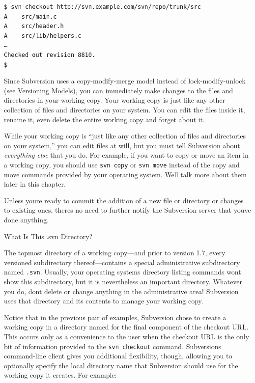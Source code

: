 \begin{verbatim}
$ svn checkout http://svn.example.com/svn/repo/trunk/src
A    src/main.c
A    src/header.h
A    src/lib/helpers.c
…
Checked out revision 8810.
$
\end{verbatim}

Since Subversion uses a copy-modify-merge model instead of
lock-modify-unlock (see \hyperref[svn.basic.vsn-models]{Versioning
Models}), you can immediately make changes to the files and directories
in your working copy. Your working copy is just like any other
collection of files and directories on your system. You can edit the
files inside it, rename it, even delete the entire working copy and
forget about it.

While your working copy is ``just like any other collection of files and
directories on your system,'' you can edit files at will, but you must
tell Subversion about \emph{everything else} that you do. For example,
if you want to copy or move an item in a working copy, you should use
\texttt{svn\ copy} or \texttt{svn\ move} instead of the copy and move
commands provided by your operating system. We\textquotesingle ll talk
more about them later in this chapter.

Unless you\textquotesingle re ready to commit the addition of a new file
or directory or changes to existing ones, there\textquotesingle s no
need to further notify the Subversion server that you\textquotesingle ve
done anything.

What Is This .svn Directory?

The topmost directory of a working copy---and prior to version 1.7,
every versioned subdirectory thereof---contains a special administrative
subdirectory named \texttt{.svn}. Usually, your operating
system\textquotesingle s directory listing commands
won\textquotesingle t show this subdirectory, but it is nevertheless an
important directory. Whatever you do, don\textquotesingle t delete or
change anything in the administrative area! Subversion uses that
directory and its contents to manage your working copy.

Notice that in the previous pair of examples, Subversion chose to create
a working copy in a directory named for the final component of the
checkout URL. This occurs only as a convenience to the user when the
checkout URL is the only bit of information provided to the
\texttt{svn\ checkout} command. Subversion\textquotesingle s
command-line client gives you additional flexibility, though, allowing
you to optionally specify the local directory name that Subversion
should use for the working copy it creates. For example:

